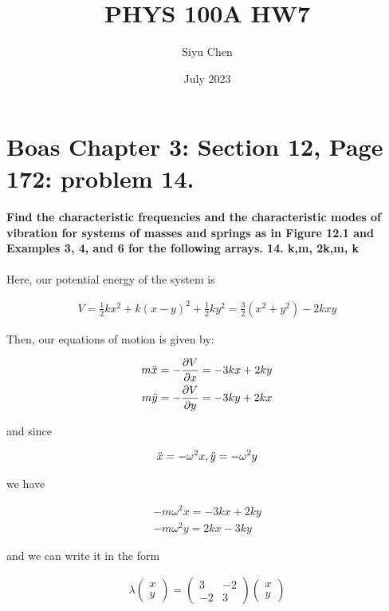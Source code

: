 \documentclass{article}
\title{PHYS 100A HW7}
\author{Siyu Chen}
\date{July 2023}
\begin{document}
\maketitle

\section{Boas Chapter 3: Section 12, Page 172: problem 14.}
\paragraph{Find the characteristic frequencies and the characteristic modes of vibration for systems of masses and springs as in Figure 12.1 and Examples 3, 4, and 6 for the following arrays. 14. k,m, 2k,m, k}

Here, our potential energy of the system is 

\begin{align}
    V = \frac{1}{2}kx^2 + k(x-y)^2 + \frac{1}{2}ky^2 = \frac{3}{2}(x^2 + y^2) - 2kxy
\end{align}

Then, our equations of motion is given by:

\begin{align}
    m\Ddot{x} = -\frac{\partial V}{\partial x} = - 3kx + 2ky\\
    m\Ddot{y} = -\frac{\partial V}{\partial y} =  - 3ky + 2kx
\end{align}

and since

\begin{align}
    \ddot{x} = - \omega^2 x, \Ddot{y} = - \omega^2 y
\end{align}

we have

\begin{align}
    -m\omega^2 x = - 3kx + 2ky \\
    -m\omega^2 y = 2kx - 3ky
\end{align}

and we can write it in the form

\begin{align}
    \lambda \begin{pmatrix}
        x \\ y
    \end{pmatrix} = 
    \begin{pmatrix}
        3 & -2 \\ -2 & 3 
    \end{pmatrix} \begin{pmatrix}
        x \\ y
    \end{pmatrix}
\end{align}
\end{document}
